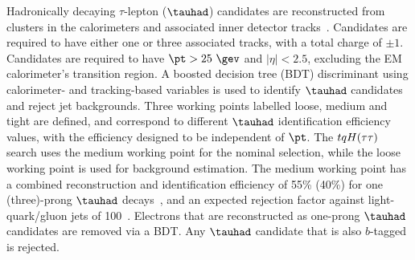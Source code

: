 Hadronically decaying $\tau$-lepton ($\tauhad$) candidates are reconstructed from clusters in the calorimeters and
associated inner detector tracks~\cite{ATL-PHYS-PUB-2015-045}. Candidates are required to have either one or three associated tracks,
with a total charge of $\pm 1$. Candidates are required to have $\pt > 25~\gev$ and $|\eta|<2.5$, excluding the EM calorimeter's transition region.
A boosted decision tree (BDT) discriminant using calorimeter- and tracking-based variables is used to identify $\tauhad$ candidates and reject
jet backgrounds. Three working points labelled loose, medium and tight are defined, and correspond to different $\tauhad$ identification efficiency 
values, with the efficiency designed to be independent of $\pt$. The $tqH(\tau\tau)$ search uses the medium
working point for the nominal selection, while the loose working point is used for background estimation.
The medium working point has a combined reconstruction and identification efficiency of 55\% (40\%) for one (three)-prong $\tauhad$ 
decays~\cite{ATLAS-CONF-2017-029}, and an expected rejection factor against light-quark/gluon jets of 100~\cite{ATL-PHYS-PUB-2015-045}. 
Electrons that are reconstructed as one-prong $\tauhad$ candidates are removed via a BDT.
Any $\tauhad$ candidate that is also $b$-tagged is rejected.

